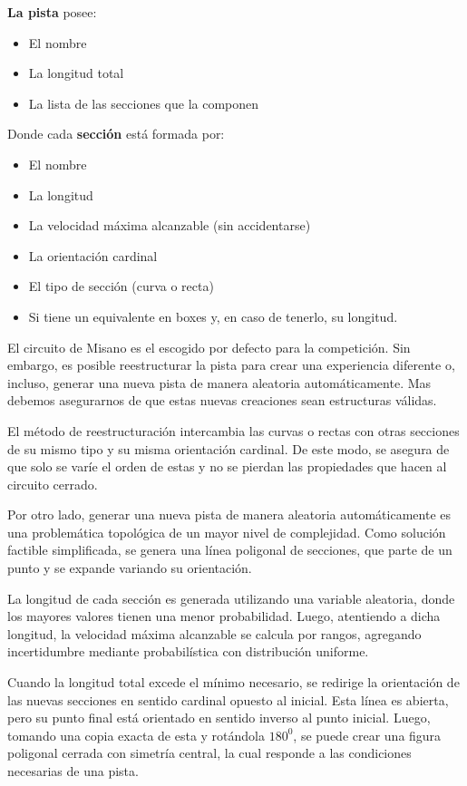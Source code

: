 \documentclass[12pt, letterpaper,spanish]{article}
\theoremstyle{definition}
\theoremstyle{remark}
\begin{document}
		\textbf{La pista} posee:
		\begin{itemize}
    		\item El nombre
		\item La longitud total
		\item La lista de las secciones que la componen
		\end{itemize}

		Donde cada \textbf{sección} está formada por:
		\begin{itemize}
    		\item El nombre
    		\item La longitud
		\item La velocidad máxima alcanzable (sin accidentarse)
		\item La orientación cardinal
		\item El tipo de sección (curva o recta)
		\item Si tiene un equivalente en boxes y, en caso de tenerlo, su longitud.
		\end{itemize}
		
		El circuito de Misano es el escogido por defecto para la competición. Sin embargo, es posible reestructurar la pista para crear una experiencia diferente o, incluso, generar una nueva pista de manera aleatoria automáticamente. Mas debemos asegurarnos de que estas nuevas creaciones sean estructuras válidas.

		El método de reestructuración intercambia las curvas o rectas con otras secciones de su mismo tipo y su misma orientación cardinal. De este modo, se asegura de que solo se varíe el orden de estas y no se pierdan las propiedades que hacen al circuito cerrado.

		Por otro lado, generar una nueva pista de manera aleatoria automáticamente es una problemática topológica de un mayor nivel de complejidad. Como solución factible simplificada, se genera una línea poligonal de secciones, que parte de un punto y se expande variando su orientación. 

		La longitud de cada sección es generada utilizando una variable aleatoria, donde los mayores valores tienen una menor probabilidad. Luego, atentiendo a dicha longitud, la velocidad máxima alcanzable se calcula por rangos, agregando incertidumbre mediante probabilística con distribución uniforme.

		Cuando la longitud total excede el mínimo necesario, se redirige la orientación de las nuevas secciones en sentido cardinal opuesto al inicial. Esta línea es abierta, pero su punto final está orientado en sentido inverso al punto inicial. Luego, tomando una copia exacta de esta y rotándola $180^0$, se puede crear una figura poligonal cerrada con simetría central, la cual responde a las condiciones necesarias de una pista.
\end{document}
